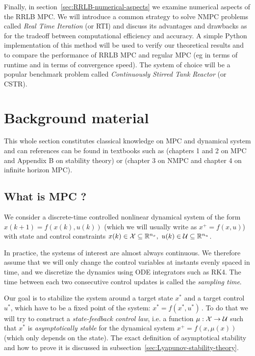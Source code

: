 \documentclass[12pt]{article}
\begin{document}
Finally, in section~\ref{sec:RRLB-numerical-aspects} we examine numerical aspects of the RRLB MPC.
We will introduce a common strategy to solve NMPC problems called \textit{Real Time Iteration} (or RTI) and discuss its advantages and drawbacks as for the tradeoff between computational efficiency and accuracy.
A simple Python implementation of this method will be used to verify our theoretical results and to compare the performance of RRLB MPC and regular MPC (eg in terms of runtime and in terms of convergence speed).
The system of choice will be a popular benchmark problem called \textit{Continuously Stirred Tank Reactor} (or CSTR).

\section{Background material}\label{sec:background-material}

This whole section constitutes classical knowledge on MPC and dynamical system and can references can be found in textbooks such as \cite{MPC-book} (chapters 1 and 2 on MPC and Appendix B on stability theory) or \cite{MPC-book-2} (chapter 3 on NMPC and chapter 4 on infinite horizon MPC).

\subsection{What is MPC ?}\label{sec:what-is-MPC}

We consider a discrete-time controlled nonlinear dynamical system of the form $x(k+1)=f(x(k), u(k))$ (which we will usually write as $x^+=f(x,u)$) with state and control constraints $x(k)\in\cal{X}\subseteq\R^{n_x},~u(k)\in\cal{U}\subseteq\R^{n_u}$.

In practice, the systems of interest are almost always continuous. We therefore assume that we will only change the control variables at instants evenly spaced in time, and we discretize the dynamics using ODE integrators such as RK4. The time between each two consecutive control updates is called the \textit{sampling time}.

Our goal is to stabilize the system around a target state $x^*$ and a target control $u^*$, which have to be a fixed point of the system: $x^*=f(x^*, u^*)$\,.
To do that we will try to construct a \textit{state-feedback control law}, i.e. a function $\mu:\cal{X}\to\cal{U}$ such that $x^*$ is \textit{asymptotically stable} for the dynamical system $x^+=f(x,\mu(x))$ (which only depends on the state).
The exact definition of asymptotical stability and how to prove it is discussed in subsection~\ref{sec:Lyapunov-stability-theory}.
\end{document}
